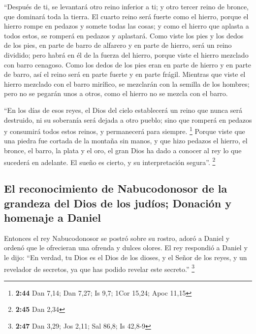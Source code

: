  ``Después de ti, se levantará otro reino inferior a ti;
y otro tercer reino de bronce, que dominará toda la tierra.
 El cuarto reino será fuerte como el hierro, porque el
hierro rompe en pedazos y somete todas las cosas; y como el hierro que
aplasta a todos estos, se romperá en pedazos y aplastará.
 Como viste los pies y los dedos de los pies, en parte de
barro de alfarero y en parte de hierro, será un reino dividido; pero
habrá en él de la fuerza del hierro, porque viste el hierro mezclado con
barro cenagoso.  Como los dedos de los pies eran en parte
de hierro y en parte de barro, así el reino será en parte fuerte y en
parte frágil.  Mientras que viste el hierro mezclado con
el barro mirífico, se mezclarán con la semilla de los hombres; pero no
se pegarán unos a otros, como el hierro no se mezcla con el barro.

 ``En los días de esos reyes, el Dios del cielo
establecerá un reino que nunca será destruido, ni su soberanía será
dejada a otro pueblo; sino que romperá en pedazos y consumirá todos
estos reinos, y permanecerá para siempre. \footnote{\textbf{2:44} Dan
  7,14; Dan 7,27; Is 9,7; 1Cor 15,24; Apoc 11,15}  Porque
viste que una piedra fue cortada de la montaña sin manos, y que hizo
pedazos el hierro, el bronce, el barro, la plata y el oro, el gran Dios
ha dado a conocer al rey lo que sucederá en adelante. El sueño es
cierto, y su interpretación segura''. \footnote{\textbf{2:45} Dan 2,34}

\hypertarget{el-reconocimiento-de-nabucodonosor-de-la-grandeza-del-dios-de-los-juduxedos-donaciuxf3n-y-homenaje-a-daniel}{%
\subsection{El reconocimiento de Nabucodonosor de la grandeza del Dios
de los judíos; Donación y homenaje a
Daniel}\label{el-reconocimiento-de-nabucodonosor-de-la-grandeza-del-dios-de-los-juduxedos-donaciuxf3n-y-homenaje-a-daniel}}

 Entonces el rey Nabucodonosor se postró sobre su rostro,
adoró a Daniel y ordenó que le ofrecieran una ofrenda y dulces olores.
 El rey respondió a Daniel y le dijo: ``En verdad, tu
Dios es el Dios de los dioses, y el Señor de los reyes, y un revelador
de secretos, ya que has podido revelar este secreto.'' \footnote{\textbf{2:47}
  Dan 3,29; Jos 2,11; Sal 86,8; Is 42,8-9}

